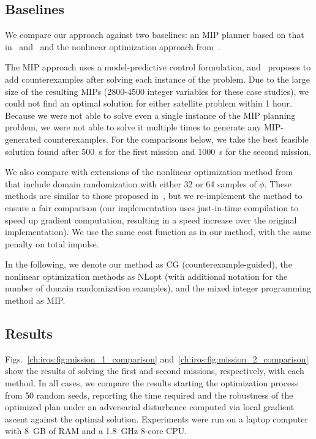 \subsection{Baselines}

We compare our approach against two baselines: an MIP planner based on that in~\cite{raman15} and~\cite{sadraddiniRobustTemporalLogic2016} and the nonlinear optimization approach from~\cite{pantSmoothOperatorControl2017,pantazidesSatelliteMissionPlanning2022}.

The MIP approach uses a model-predictive control formulation, and~\cite{raman15} proposes to add counterexamples after solving each instance of the problem. Due to the large size of the resulting MIPs (2800-4500 integer variables for these case studies), we could not find an optimal solution for either satellite problem within 1 hour. Because we were not able to solve even a single instance of the MIP planning problem, we were not able to solve it multiple times to generate any MIP-generated counterexamples. For the comparisons below, we take the best feasible solution found after \SI{500}{s} for the first mission and \SI{1000}{s} for the second mission.

We also compare with extensions of the nonlinear optimization method from~\cite{pantSmoothOperatorControl2017,pantazidesSatelliteMissionPlanning2022} that include domain randomization with either 32 or 64 samples of $\phi$. These methods are similar to those proposed in~\cite{leungBackPropagationSignalTemporal2021}, but we re-implement the method to ensure a fair comparison (our implementation uses just-in-time compilation to speed up gradient computation, resulting in a speed increase over the original implementation). We use the same cost function as in our method, with the same penalty on total impulse.

In the following, we denote our method as CG (counterexample-guided), the nonlinear optimization methods as NLopt (with additional notation for the number of domain randomization examples), and the mixed integer programming method as MIP.

\subsection{Results}

Figs.~\ref{ch:iros:fig:mission_1_comparison} and~\ref{ch:iros:fig:mission_2_comparison} show the results of solving the first and second missions, respectively, with each method. In all cases, we compare the results starting the optimization process from 50 random seeds, reporting the time required and the robustness of the optimized plan under an adversarial disturbance computed via local gradient ascent against the optimal solution. Experiments were run on a laptop computer with \SI{8}{GB} of RAM and a \SI{1.8}{GHz} 8-core CPU.


